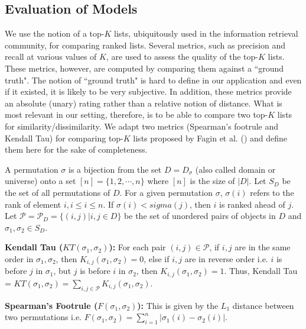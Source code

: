 \documentclass[a4paper,man,natbib]{apa6}
\begin{document}
\begin{enumerate}
\end{enumerate}


\subsection{Evaluation of Models } We use the notion of a top-$K$ lists, ubiquitously used in the information retrieval community, for comparing ranked lists. Several metrics, such as precision and recall at various values of $K$, are used to assess the quality of the top-$K$ lists. These metrics, however, are computed by comparing them against a ``ground truth". The notion of ``ground truth" is hard to define in our application and even if it existed, it is likely to be very subjective. In addition, these metrics provide an absolute (unary) rating rather than a relative notion of distance. What is most relevant in our setting, therefore, is to be able to compare two top-$K$ lists for similarity/dissimilarity. We adapt two metrics (Spearman's footrule and Kendall Tau) for comparing top-$K$ lists proposed by Fagin et al. (\cite{Fagin_03}) and define them here for the sake of completeness.

A permutation $\sigma$ is a bijection from the set $D = D_{\sigma}$ (also called domain or universe) onto a set $[n] = \{1,2, \cdots, n\}$ where $[n]$ is the size of $|D|$. Let $S_{D}$ be the set of all permutations of $D$. For a given permutation $\sigma$, $\sigma(i)$ refers to the rank of element $i, i \le i \le n$. If $\sigma(i) < sigma(j)$, then $i$ is ranked ahead of $j$. Let $\mathcal{P}=\mathcal{P}_D = \{(i,j) | i, j \in D\}$ be the set of unordered pairs of objects in $D$ and $\sigma_1, \sigma_2 \in S_D$. 

\noindent \textbf{Kendall Tau ($KT(\sigma_1, \sigma_2)$):} For each pair $(i,j) \in \mathcal{P}$, if $i, j$ are in the same order in $\sigma_1, \sigma_2$, then $K_{i,j} (\sigma_1, \sigma_2)=0$, else if $i, j$ are in reverse order i.e. $i$ is before $j$ in $\sigma_1$, but $j$ is before $i$ in $\sigma_2$, then $K_{i,j} (\sigma_1, \sigma_2)=1$. Thus, Kendall Tau = $KT(\sigma_1, \sigma_2)=\sum_{{i,j} \in \mathcal{P}} K_{i,j} (\sigma_1, \sigma_2)$.

\noindent \textbf{Spearman's Footrule ($F(\sigma_1, \sigma_2)$): } This is given by the $L_1$ distance between two permutations i.e. $F(\sigma_1, \sigma_2) = \sum_{i=1}^n |\sigma_1(i) - \sigma_2(i)|$.
\end{document}
